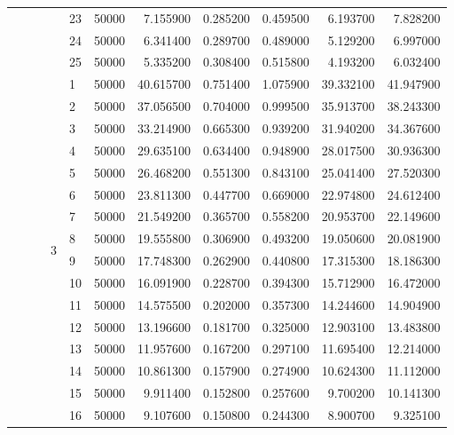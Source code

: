 \begin{tabular}{llllllrrrrr}
 &  &  &  & 23 & 50000 & 7.155900 & 0.285200 & 0.459500 & 6.193700 & 7.828200 \\
\cline{5-11}
 &  &  &  & 24 & 50000 & 6.341400 & 0.289700 & 0.489000 & 5.129200 & 6.997000 \\
\cline{5-11}
 &  &  &  & 25 & 50000 & 5.335200 & 0.308400 & 0.515800 & 4.193200 & 6.032400 \\
\cline{4-11} \cline{5-11}
 &  &  & \multirow[t]{25}{*}{3} & 1 & 50000 & 40.615700 & 0.751400 & 1.075900 & 39.332100 & 41.947900 \\
\cline{5-11}
 &  &  &  & 2 & 50000 & 37.056500 & 0.704000 & 0.999500 & 35.913700 & 38.243300 \\
\cline{5-11}
 &  &  &  & 3 & 50000 & 33.214900 & 0.665300 & 0.939200 & 31.940200 & 34.367600 \\
\cline{5-11}
 &  &  &  & 4 & 50000 & 29.635100 & 0.634400 & 0.948900 & 28.017500 & 30.936300 \\
\cline{5-11}
 &  &  &  & 5 & 50000 & 26.468200 & 0.551300 & 0.843100 & 25.041400 & 27.520300 \\
\cline{5-11}
 &  &  &  & 6 & 50000 & 23.811300 & 0.447700 & 0.669000 & 22.974800 & 24.612400 \\
\cline{5-11}
 &  &  &  & 7 & 50000 & 21.549200 & 0.365700 & 0.558200 & 20.953700 & 22.149600 \\
\cline{5-11}
 &  &  &  & 8 & 50000 & 19.555800 & 0.306900 & 0.493200 & 19.050600 & 20.081900 \\
\cline{5-11}
 &  &  &  & 9 & 50000 & 17.748300 & 0.262900 & 0.440800 & 17.315300 & 18.186300 \\
\cline{5-11}
 &  &  &  & 10 & 50000 & 16.091900 & 0.228700 & 0.394300 & 15.712900 & 16.472000 \\
\cline{5-11}
 &  &  &  & 11 & 50000 & 14.575500 & 0.202000 & 0.357300 & 14.244600 & 14.904900 \\
\cline{5-11}
 &  &  &  & 12 & 50000 & 13.196600 & 0.181700 & 0.325000 & 12.903100 & 13.483800 \\
\cline{5-11}
 &  &  &  & 13 & 50000 & 11.957600 & 0.167200 & 0.297100 & 11.695400 & 12.214000 \\
\cline{5-11}
 &  &  &  & 14 & 50000 & 10.861300 & 0.157900 & 0.274900 & 10.624300 & 11.112000 \\
\cline{5-11}
 &  &  &  & 15 & 50000 & 9.911400 & 0.152800 & 0.257600 & 9.700200 & 10.141300 \\
\cline{5-11}
 &  &  &  & 16 & 50000 & 9.107600 & 0.150800 & 0.244300 & 8.900700 & 9.325100 \\

\end{tabular}
